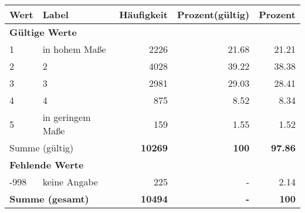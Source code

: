      \begin{longtable}{lXrrr}
     \toprule
     \textbf{Wert} & \textbf{Label} & \textbf{Häufigkeit} & \textbf{Prozent(gültig)} & \textbf{Prozent} \\
     \endhead
     \midrule
     \multicolumn{5}{l}{\textbf{Gültige Werte}}\\

     1 &
     \multicolumn{1}{X}{ in hohem Maße   } &


       \num{2226} &
       \num[round-mode=places,round-precision=2]{21.68} &
         \num[round-mode=places,round-precision=2]{21.21} \\

     2 &
     \multicolumn{1}{X}{ 2   } &


       \num{4028} &
       \num[round-mode=places,round-precision=2]{39.22} &
         \num[round-mode=places,round-precision=2]{38.38} \\

     3 &
     \multicolumn{1}{X}{ 3   } &


       \num{2981} &
       \num[round-mode=places,round-precision=2]{29.03} &
         \num[round-mode=places,round-precision=2]{28.41} \\

     4 &
     \multicolumn{1}{X}{ 4   } &


       \num{875} &
       \num[round-mode=places,round-precision=2]{8.52} &
         \num[round-mode=places,round-precision=2]{8.34} \\

     5 &
     \multicolumn{1}{X}{ in geringem Maße   } &


       \num{159} &
       \num[round-mode=places,round-precision=2]{1.55} &
         \num[round-mode=places,round-precision=2]{1.52} \\
     \midrule
     \multicolumn{2}{l}{Summe (gültig)} &
       \textbf{\num{10269}} &
     \textbf{\num{100}} &
       \textbf{\num[round-mode=places,round-precision=2]{97.86}} \\
     \multicolumn{5}{l}{\textbf{Fehlende Werte}}\\
       -998 &
       keine Angabe &
         \num{225} &
        - &
         \num[round-mode=places,round-precision=2]{2.14} \\
     \midrule
     \multicolumn{2}{l}{\textbf{Summe (gesamt)}} &
          \textbf{\num{10494}} &
        \textbf{-} &
        \textbf{\num{100}} \\
     \bottomrule
     \end{longtable}
     
